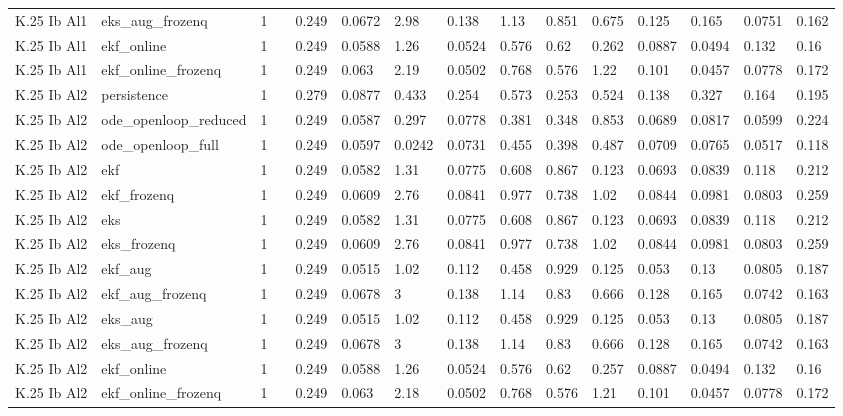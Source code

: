 \begin{table}[t]
\begin{tabular}{lllllllllllllll}
K.25 Ib Al1 & eks\_aug\_frozenq & 1 &  & 0.249 & 0.0672 & 2.98 & 0.138 & 1.13 & 0.851 & 0.675 & 0.125 & 0.165 & 0.0751 & 0.162 \\
K.25 Ib Al1 & ekf\_online & 1 &  & 0.249 & 0.0588 & 1.26 & 0.0524 & 0.576 & 0.62 & 0.262 & 0.0887 & 0.0494 & 0.132 & 0.16 \\
K.25 Ib Al1 & ekf\_online\_frozenq & 1 &  & 0.249 & 0.063 & 2.19 & 0.0502 & 0.768 & 0.576 & 1.22 & 0.101 & 0.0457 & 0.0778 & 0.172 \\
K.25 Ib Al2 & persistence & 1 &  & 0.279 & 0.0877 & 0.433 & 0.254 & 0.573 & 0.253 & 0.524 & 0.138 & 0.327 & 0.164 & 0.195 \\
K.25 Ib Al2 & ode\_openloop\_reduced & 1 &  & 0.249 & 0.0587 & 0.297 & 0.0778 & 0.381 & 0.348 & 0.853 & 0.0689 & 0.0817 & 0.0599 & 0.224 \\
K.25 Ib Al2 & ode\_openloop\_full & 1 &  & 0.249 & 0.0597 & 0.0242 & 0.0731 & 0.455 & 0.398 & 0.487 & 0.0709 & 0.0765 & 0.0517 & 0.118 \\
K.25 Ib Al2 & ekf & 1 &  & 0.249 & 0.0582 & 1.31 & 0.0775 & 0.608 & 0.867 & 0.123 & 0.0693 & 0.0839 & 0.118 & 0.212 \\
K.25 Ib Al2 & ekf\_frozenq & 1 &  & 0.249 & 0.0609 & 2.76 & 0.0841 & 0.977 & 0.738 & 1.02 & 0.0844 & 0.0981 & 0.0803 & 0.259 \\
K.25 Ib Al2 & eks & 1 &  & 0.249 & 0.0582 & 1.31 & 0.0775 & 0.608 & 0.867 & 0.123 & 0.0693 & 0.0839 & 0.118 & 0.212 \\
K.25 Ib Al2 & eks\_frozenq & 1 &  & 0.249 & 0.0609 & 2.76 & 0.0841 & 0.977 & 0.738 & 1.02 & 0.0844 & 0.0981 & 0.0803 & 0.259 \\
K.25 Ib Al2 & ekf\_aug & 1 &  & 0.249 & 0.0515 & 1.02 & 0.112 & 0.458 & 0.929 & 0.125 & 0.053 & 0.13 & 0.0805 & 0.187 \\
K.25 Ib Al2 & ekf\_aug\_frozenq & 1 &  & 0.249 & 0.0678 & 3 & 0.138 & 1.14 & 0.83 & 0.666 & 0.128 & 0.165 & 0.0742 & 0.163 \\
K.25 Ib Al2 & eks\_aug & 1 &  & 0.249 & 0.0515 & 1.02 & 0.112 & 0.458 & 0.929 & 0.125 & 0.053 & 0.13 & 0.0805 & 0.187 \\
K.25 Ib Al2 & eks\_aug\_frozenq & 1 &  & 0.249 & 0.0678 & 3 & 0.138 & 1.14 & 0.83 & 0.666 & 0.128 & 0.165 & 0.0742 & 0.163 \\
K.25 Ib Al2 & ekf\_online & 1 &  & 0.249 & 0.0588 & 1.26 & 0.0524 & 0.576 & 0.62 & 0.257 & 0.0887 & 0.0494 & 0.132 & 0.16 \\
K.25 Ib Al2 & ekf\_online\_frozenq & 1 &  & 0.249 & 0.063 & 2.18 & 0.0502 & 0.768 & 0.576 & 1.21 & 0.101 & 0.0457 & 0.0778 & 0.172 \\

\end{tabular}
\end{table}
